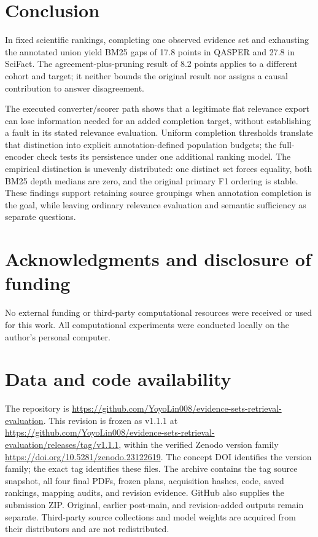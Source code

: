 \documentclass[twoside,a4paper,11pt]{article}
\begin{document}
\section{Conclusion}
In fixed scientific rankings, completing one observed evidence set and exhausting the annotated union yield BM25 gaps of 17.8 points in QASPER and 27.8 in SciFact. The agreement-plus-pruning result of 8.2 points applies to a different cohort and target; it neither bounds the original result nor assigns a causal contribution to answer disagreement.

The executed converter/scorer path shows that a legitimate flat relevance export can lose information needed for an added completion target, without establishing a fault in its stated relevance evaluation. Uniform completion thresholds translate that distinction into explicit annotation-defined population budgets; the full-encoder check tests its persistence under one additional ranking model. The empirical distinction is unevenly distributed: one distinct set forces equality, both BM25 depth medians are zero, and the original primary F1 ordering is stable. These findings support retaining source groupings when annotation completion is the goal, while leaving ordinary relevance evaluation and semantic sufficiency as separate questions.


\section{Acknowledgments and disclosure of funding}
No external funding or third-party computational resources were received or used for this work. All computational experiments were conducted locally on the author's personal computer.


\section{Data and code availability}
The repository is \url{https://github.com/YoyoLin008/evidence-sets-retrieval-evaluation}. This revision is frozen as v1.1.1 at \url{https://github.com/YoyoLin008/evidence-sets-retrieval-evaluation/releases/tag/v1.1.1}, within the verified Zenodo version family \url{https://doi.org/10.5281/zenodo.23122619}. The concept DOI identifies the version family; the exact tag identifies these files. The archive contains the tag source snapshot, all four final PDFs, frozen plans, acquisition hashes, code, saved rankings, mapping audits, and revision evidence. GitHub also supplies the submission ZIP. Original, earlier post-main, and revision-added outputs remain separate. Third-party source collections and model weights are acquired from their distributors and are not redistributed.
\end{document}

